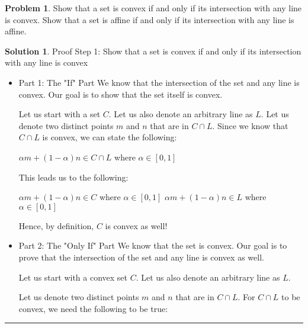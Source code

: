 \documentclass{article}
\theoremstyle{definition}
\newtheorem{problem}{Problem}
\def\fline{\rule{0.75\linewidth}{0.5pt}}
\newcommand{\finishline}{\begin{center}\fline\end{center}}
\newtheorem*{solution*}{Solution}
\newenvironment{solution}{\begin{solution*}}{{\finishline} \end{solution*}}
\begin{document}
\begin{problem}
    Show that a set is convex if and only if its intersection with any line is convex. Show that a set is affine if and only if its intersection with any line is affine.

    \begin{solution} Proof \newline 
        Step 1: Show that a set is convex if and only if its intersection with any line is convex 

        \begin{itemize}
            \item  Part 1: The "If" Part \newline 
        We know that the intersection of the set and any line is convex. Our goal is to show that the set itself is convex. \newline 

        Let us start with a set $C$. Let us also denote an arbitrary line as $L$. Let us denote two distinct points $m$ and $n$ that are in $C \cap L$. Since we know that $C \cap L$ is convex, we can state the following: \newline 

        $\alpha m + (1 - \alpha)n \in C \cap L$ where $\alpha \in [0, 1]$ \newline 

        This leads us to the following: \newline 

        $\alpha m + (1 - \alpha)n \in C$ where $\alpha \in [0, 1]$ \newline 
        $\alpha m + (1 - \alpha)n \in L$ where $\alpha \in [0, 1]$ \newline 

        Hence, by definition, $C$ is convex as well! 
        

            \item Part 2: The "Only If" Part \newline
        We know that the set is convex. Our goal is to prove that the intersection of the set and any line is convex as well. \newline 

        Let us start with a convex set $C$. Let us also denote an arbitrary line as $L$. \newline 

        Let us denote two distinct points $m$ and $n$ that are in $C \cap L$. For $C \cap L$ to be convex, we need the following to be true: \newline 


\end{itemize}
\end{solution}
\end{problem}
\end{document}
